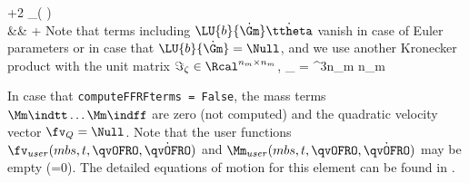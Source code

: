     															+2 \Mm_{{\widetilde\Psi}{\Psi}}\tp\left( \dot\tzeta \otimes \Im \right) \LU{b}{\tomega} \nonumber \\
    										&& + \left[ \Mm_{\tilde\xv\cRef{\Psi}}\tp + \Mm_{{\widetilde\Psi}{\Psi}}\tp\left( \tzeta \otimes \Im \right)
    										     \right] \LU{b}{\dot \Gm} \dot \ttheta \eqDot
    \eea
    Note that terms including $\LU{b}{\dot \Gm} \dot \ttheta$ vanish in case of Euler parameters or in case that $\LU{b}{\dot \Gm} = \Null$,
    and we use another Kronecker product with the unit matrix $\Im_\zeta \in \Rcal^{n_m \times n_m}$,
    \be
      \Im_\zeta \otimes {} =  {}{\ddots}{} {}{}{} \in \Rcal^{3n_m \times n_m}
    \ee
    
    
    In case that \texttt{computeFFRFterms = False}, the mass terms $\Mm\indtt \ldots \Mm\indff$ are zero (not computed) and
    the quadratic velocity vector $\fv_Q = \Null$.
    Note that the user functions $\fv_{user}(mbs, t,\qvOFRO,\dot \qvOFRO)$ and 
    $\Mm_{user}(mbs, t,\qvOFRO,\dot \qvOFRO)$ may be empty (=0). 
    The detailed equations of motion for this element can be found in \cite{ZwoelferGerstmayr2021}.

